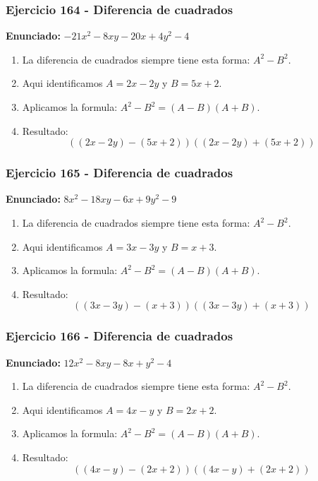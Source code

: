 \documentclass[11pt,a4paper]{article}
\begin{document}
\vspace{0.2cm}
\subsubsection*{Ejercicio 164 - Diferencia de cuadrados}
\textbf{Enunciado:} $ - 21 x^{2} - 8 x y - 20 x + 4 y^{2} - 4 $\par
\begin{enumerate}[leftmargin=2em]
\item La diferencia de cuadrados siempre tiene esta forma: \(A^2-B^2\).
\item Aqui identificamos \(A=2 x - 2 y\) y \(B=5 x + 2\).
\item Aplicamos la formula: \(A^2-B^2=(A-B)(A+B)\).
\item Resultado: \[\boxed{\left(\left(2 x - 2 y\right)-\left(5 x + 2\right)\right)\left(\left(2 x - 2 y\right)+\left(5 x + 2\right)\right)}\]
\end{enumerate}

\vspace{0.2cm}
\subsubsection*{Ejercicio 165 - Diferencia de cuadrados}
\textbf{Enunciado:} $ 8 x^{2} - 18 x y - 6 x + 9 y^{2} - 9 $\par
\begin{enumerate}[leftmargin=2em]
\item La diferencia de cuadrados siempre tiene esta forma: \(A^2-B^2\).
\item Aqui identificamos \(A=3 x - 3 y\) y \(B=x + 3\).
\item Aplicamos la formula: \(A^2-B^2=(A-B)(A+B)\).
\item Resultado: \[\boxed{\left(\left(3 x - 3 y\right)-\left(x + 3\right)\right)\left(\left(3 x - 3 y\right)+\left(x + 3\right)\right)}\]
\end{enumerate}

\vspace{0.2cm}
\subsubsection*{Ejercicio 166 - Diferencia de cuadrados}
\textbf{Enunciado:} $ 12 x^{2} - 8 x y - 8 x + y^{2} - 4 $\par
\begin{enumerate}[leftmargin=2em]
\item La diferencia de cuadrados siempre tiene esta forma: \(A^2-B^2\).
\item Aqui identificamos \(A=4 x - y\) y \(B=2 x + 2\).
\item Aplicamos la formula: \(A^2-B^2=(A-B)(A+B)\).
\item Resultado: \[\boxed{\left(\left(4 x - y\right)-\left(2 x + 2\right)\right)\left(\left(4 x - y\right)+\left(2 x + 2\right)\right)}\]
\end{enumerate}
\end{document}
